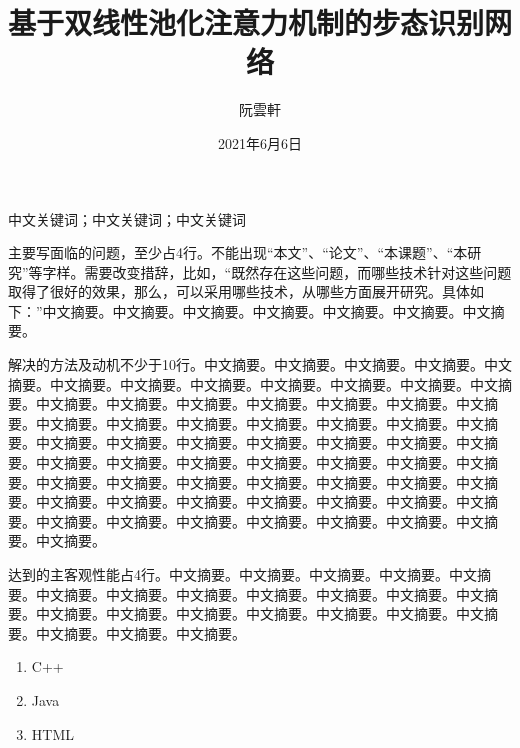 \documentclass[supercite]{HustGraduPaper}
\title{基于双线性池化注意力机制的步态识别网络}
\author{阮雲軒}
\date{2021年6月6日}
\theoremstyle{definition}
\begin{document}
\maketitle

\statement

\clearpage


\begin{cnabstract}{中文关键词；中文关键词；中文关键词}

主要写面临的问题，至少占4行。不能出现``本文''、``论文''、``本课题''、``本研究''等字样。需要改变措辞，比如，``既然存在这些问题，而哪些技术针对这些问题取得了很好的效果，那么，可以采用哪些技术，从哪些方面展开研究。具体如下：''中文摘要。中文摘要。中文摘要。中文摘要。中文摘要。中文摘要。中文摘要。

解决的方法及动机不少于10行。中文摘要。中文摘要。中文摘要。中文摘要。中文摘要。中文摘要。中文摘要。中文摘要。中文摘要。中文摘要。中文摘要。中文摘要。中文摘要。中文摘要。中文摘要。中文摘要。中文摘要。中文摘要。中文摘要。中文摘要。中文摘要。中文摘要。中文摘要。中文摘要。中文摘要。中文摘要。中文摘要。中文摘要。中文摘要。中文摘要。中文摘要。中文摘要。中文摘要。中文摘要。中文摘要。中文摘要。中文摘要。中文摘要。中文摘要。中文摘要。中文摘要。中文摘要。中文摘要。中文摘要。中文摘要。中文摘要。中文摘要。中文摘要。中文摘要。中文摘要。中文摘要。中文摘要。中文摘要。中文摘要。中文摘要。中文摘要。中文摘要。中文摘要。中文摘要。中文摘要。中文摘要。中文摘要。

达到的主客观性能占4行。中文摘要。中文摘要。中文摘要。中文摘要。中文摘要。中文摘要。中文摘要。中文摘要。中文摘要。中文摘要。中文摘要。中文摘要。中文摘要。中文摘要。中文摘要。中文摘要。中文摘要。中文摘要。中文摘要。中文摘要。中文摘要。中文摘要。

\begin{enumerate}
	\renewcommand{\labelenumi}{\theenumi)}
	\item C++
	\item Java
	\item HTML
\end{enumerate}

\end{cnabstract}
\end{document}
